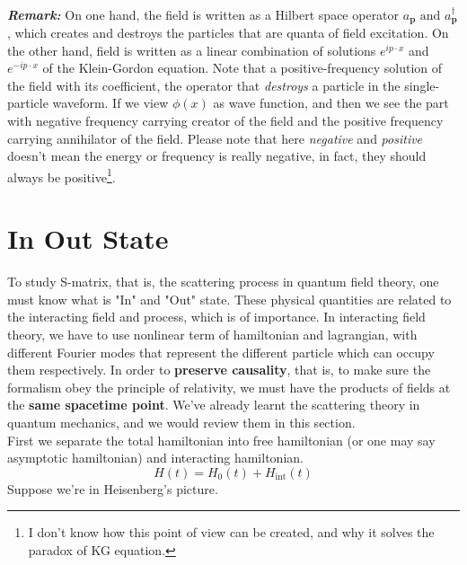 \documentclass[12pt]{article}
\numberwithin{equation}{section}
\begin{document}
\\\indent \textit{\textbf{Remark:}} On one hand, the field is written as a Hilbert space operator $a_{\mathbf{p}} \text{ and }a^{\dagger}_{\mathbf{p}}$, which creates and destroys the particles that are quanta of field excitation.
On the other hand, field is written as a linear combination of solutions $e^{ip\cdot x}$ and $e^{-ip\cdot x}$ of the Klein-Gordon equation. 
Note that a positive-frequency solution of the field with its coefficient, the operator that \textit{destroys} a particle in the single-particle waveform. If we view $\phi(x)$ as wave function, and then we see the part with negative frequency carrying creator of the field and the positive frequency carrying annihilator of the field.
Please note that here \textit{negative} and \textit{positive} doesn't mean the energy or frequency is really negative, in fact, they should always be positive\footnote{I don't know how this point of view can be created, and why it solves the paradox of KG equation.}.

\section{In Out State}
To study S-matrix, that is, the scattering process in quantum field theory, one must know what is "In" and "Out" state.
These physical quantities are related to the interacting field and process, which is of importance.
In interacting field theory, we have to use nonlinear term of hamiltonian and lagrangian, with different Fourier modes that represent the different particle which can occupy them respectively.
In order to \textbf{preserve causality}, that is, to make sure the formalism obey the principle of relativity, we must have the products of fields at the \textbf{same spacetime point}.
We've already learnt the scattering theory in quantum mechanics, and we would review them in this section.
\\\indent First we separate the total hamiltonian into free hamiltonian (or one may say asymptotic hamiltonian) and interacting hamiltonian.
\begin{equation}
    H(t) = H_{0}(t) + H_{\text{int}}(t)
\end{equation}
Suppose we're in Heisenberg's picture.
\end{document}
